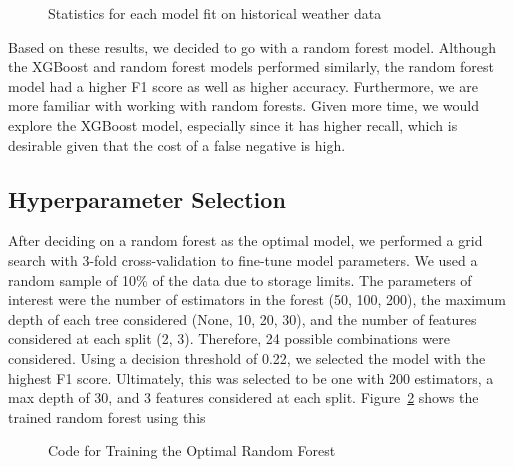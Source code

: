 \documentclass[
  12pt,
  letterpaper,
  DIV=11,
  numbers=noendperiod]{scrartcl}
\begin{document}
\begin{figure}[H]

\caption{\label{fig-modelTable}Statistics for each model fit on
historical weather data}


\end{figure}%

Based on these results, we decided to go with a random forest model.
Although the XGBoost and random forest models performed similarly, the
random forest model had a higher F1 score as well as higher accuracy.
Furthermore, we are more familiar with working with random forests.
Given more time, we would explore the XGBoost model, especially since it
has higher recall, which is desirable given that the cost of a false
negative is high.

\subsection{Hyperparameter Selection}\label{hyperparameter-selection}

After deciding on a random forest as the optimal model, we performed a
grid search with 3-fold cross-validation to fine-tune model parameters.
We used a random sample of 10\% of the data due to storage limits. The
parameters of interest were the number of estimators in the forest (50,
100, 200), the maximum depth of each tree considered (None, 10, 20, 30),
and the number of features considered at each split (2, 3). Therefore,
24 possible combinations were considered. Using a decision threshold of
0.22, we selected the model with the highest F1 score. Ultimately, this
was selected to be one with 200 estimators, a max depth of 30, and 3
features considered at each split. Figure~\ref{fig-codeRF} shows the
trained random forest using this

\begin{figure}[H]


\caption{\label{fig-codeRF}Code for Training the Optimal Random Forest}

\end{figure}%
\end{document}
